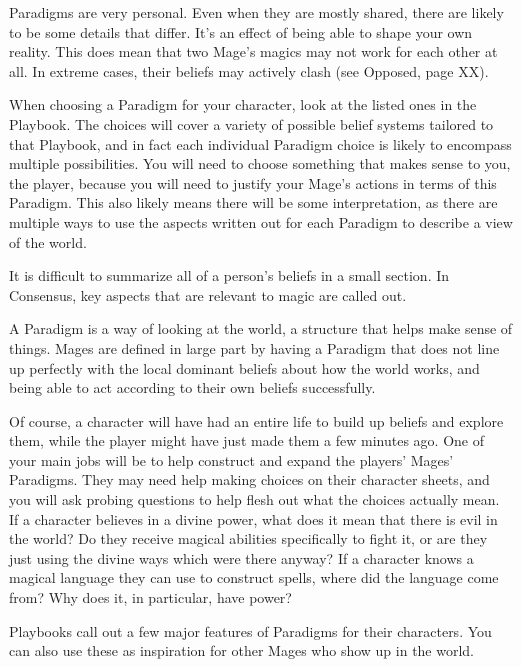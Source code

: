 \documentclass[
  oneside,
  statementpaper,
  9pt]{memoir}
\begin{document}
\begin{Player}
Paradigms are very personal. Even when they are mostly shared, there are likely to be some details that differ. It’s an effect of being able to shape your own reality. This does mean that two Mage’s magics may not work for each other at all. In extreme cases, their beliefs may actively clash (see Opposed, page XX).

When choosing a Paradigm for your character, look at the listed ones in the Playbook. The choices will cover a variety of possible belief systems tailored to that Playbook, and in fact each individual Paradigm choice is likely to encompass multiple possibilities. You will need to choose something that makes sense to you, the player, because you will need to justify your Mage’s actions in terms of this Paradigm. This also likely means there will be some interpretation, as there are multiple ways to use the aspects written out for each Paradigm to describe a view of the world.

It is difficult to summarize all of a person’s beliefs in a small section. In Consensus, key aspects that are relevant to magic are called out.

\end{Player}

\begin{MC}

A Paradigm is a way of looking at the world, a structure that helps make sense of things. Mages are defined in large part by having a Paradigm that does not line up perfectly with the local dominant beliefs about how the world works, and being able to act according to their own beliefs successfully.

Of course, a character will have had an entire life to build up beliefs and explore them, while the player might have just made them a few minutes ago. One of your main jobs will be to help construct and expand the players' Mages' Paradigms. They may need help making choices on their character sheets, and you will ask probing questions to help flesh out what the choices actually mean. If a character believes in a divine power, what does it mean that there is evil in the world? Do they receive magical abilities specifically to fight it, or are they just using the divine ways which were there anyway? If a character knows a magical language they can use to construct spells, where did the language come from? Why does it, in particular, have power?

Playbooks call out a few major features of Paradigms for their characters. You can also use these as inspiration for other Mages who show up in the world.

\end{MC}
\end{document}
